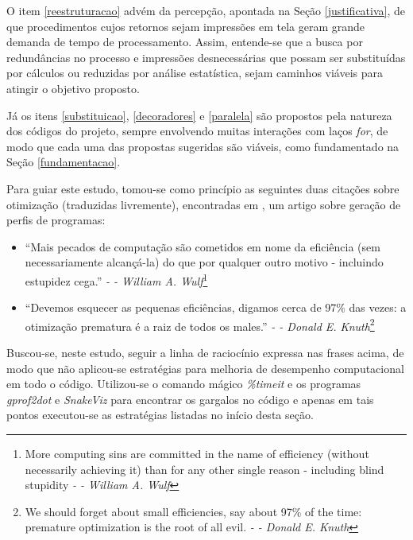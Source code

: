 \documentclass[12pt]{article}
\newcommand{\aspas}[1]{``#1''} %
\begin{document}
O item \ref{reestruturacao} advém da percepção, apontada na Seção \ref{justificativa}, de que procedimentos cujos retornos sejam impressões em tela geram grande demanda de tempo de processamento. Assim, entende-se que a busca por redundâncias no processo e impressões desnecessárias que possam ser substituídas por cálculos ou reduzidas por análise estatística, sejam caminhos viáveis para atingir o objetivo proposto.

Já os itens \ref{substituicao}, \ref{decoradores} e \ref{paralela} são propostos pela natureza dos códigos do projeto, sempre envolvendo muitas interações com laços \textit{for}, de modo que cada uma das propostas sugeridas são viáveis, como fundamentado na Seção \ref{fundamentacao}. 

Para guiar este estudo, tomou-se como princípio as seguintes duas citações sobre otimização (traduzidas livremente), encontradas em \cite{hegde:2004}, um artigo sobre geração de perfis de programas:

\begin{itemize}
	\item \aspas{Mais pecados de computação são cometidos em nome da eficiência (sem necessariamente alcançá-la) do que por qualquer outro motivo - incluindo estupidez cega.} \textit{- -  William A. Wulf}\footnote{More computing sins are committed in the name of efficiency (without necessarily achieving it) than for any other single reason - including blind stupidity \textit{- -  William A. Wulf}}
	\item \aspas{Devemos esquecer as pequenas eficiências, digamos cerca de 97\% das vezes: a otimização prematura é a raiz de todos os males.} \textit{- -  Donald E. Knuth}\footnote{We should forget about small efficiencies, say about 97\% of the time: premature optimization is the root of all evil. \textit{- -  Donald E. Knuth}}
\end{itemize}

Buscou-se, neste estudo, seguir a linha de raciocínio expressa nas frases acima, de modo que não aplicou-se estratégias para melhoria de desempenho computacional em todo o código. Utilizou-se o comando mágico \textit{\%timeit} e os programas \textit{gprof2dot} e \textit{SnakeViz} para encontrar os gargalos no código e apenas em tais pontos executou-se as estratégias listadas no início desta seção.


\end{document}
